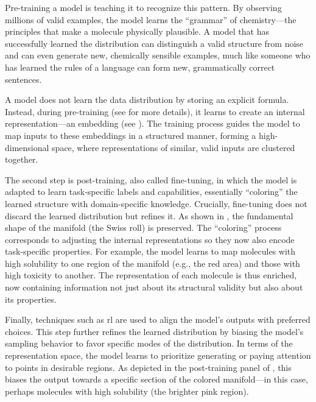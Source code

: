  Pre-training a model is teaching it to recognize this pattern. 
 By observing millions of valid examples, the model learns the \enquote{grammar} of chemistry---the principles that make a molecule physically plausible. 
 A model that has successfully learned the distribution can distinguish a valid structure from noise and can even generate new, chemically sensible examples, much like someone who has learned the rules of a language can form new, grammatically correct sentences.  

A model does not learn the data distribution by storing an explicit formula. Instead, during pre-training (see  for more details), it learns to create an internal representation---an embedding (see ).
The training process guides the model to map inputs to these embeddings in a structured manner, forming a high-dimensional space, where representations of similar, valid inputs are clustered together.


The second step is post-training, also called fine-tuning, in which the model is adapted to learn task-specific labels and capabilities, essentially \enquote{coloring} the learned structure with domain-specific knowledge. 
Crucially, fine-tuning does not discard the learned distribution but refines it. 
As shown in , the fundamental shape of the manifold (the Swiss roll) is preserved. 
The \enquote{coloring} process corresponds to adjusting the internal representations so they now also encode task-specific properties. 
For example, the model learns to map molecules with high solubility to one region of the manifold (e.g., the red area) and those with high toxicity to another. 
The representation of each molecule is thus enriched, now containing information not just about its structural validity but also about its properties.

Finally, techniques such as \gls{rl} are used to align the model's outputs with preferred choices. 
This step further refines the learned distribution by biasing the model's sampling behavior to favor specific modes of the distribution. 
In terms of the representation space, the model learns to prioritize generating or paying attention to points in desirable regions. As depicted in the post-training panel of , this biases the output towards a specific section of the colored manifold---in this case, perhaps molecules with high solubility (the brighter pink region).



